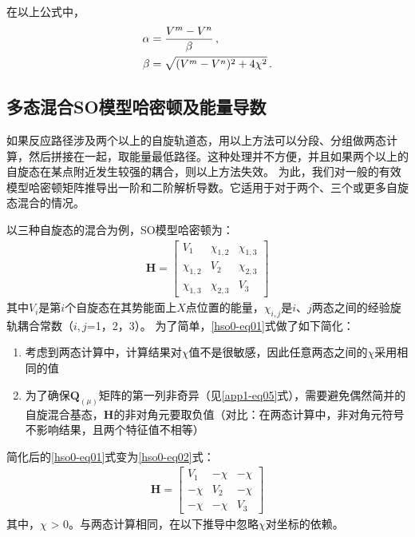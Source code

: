 \documentclass[UTF8]{ctexart}
\begin{document}
在以上公式中，
\begin{align}\label{para-eq01}
\alpha &= \frac{V^m - V^n}{\beta} \, \rm , \\ \label{para-eq02}
\beta &= \sqrt{(V^m - V^n)^2 + 4\chi^2} \, \rm .
\end{align}

\subsection{多态混合SO模型哈密顿及能量导数}

如果反应路径涉及两个以上的自旋轨道态，用以上方法可以分段、分组做两态计算，然后拼接在一起，取能量最低路径\cite{ref4}。这种处理并不方便，并且如果两个以上的自旋态在某点附近发生较强的耦合，则以上方法失效。
为此，我们对一般的有效模型哈密顿矩阵推导出一阶和二阶解析导数。它适用于对于两个、三个或更多自旋态混合的情况。

以三种自旋态的混合为例，SO模型哈密顿为：
\begin{align}\label{hso0-eq01}
\mathbf{H} = \left[\begin{array}{ccc}
    V_1 & \chi_{1,2} & \chi_{1,3} \\
    \chi_{1,2} & V_2 & \chi_{2,3} \\
    \chi_{1,3} & \chi_{2,3} & V_3
\end{array}\right]
\end{align}
其中$V_i$是第$i$个自旋态在其势能面上$X$点位置的能量，$\chi_{i,j}$是$i$、$j$两态之间的经验旋轨耦合常数（$i,j$=1，2，3）。
为了简单，\eqref{hso0-eq01}式做了如下简化：
\begin{enumerate}
\item 考虑到两态计算中，计算结果对$\chi$值不是很敏感，因此任意两态之间的$\chi$采用相同的值
\item 为了确保$\mathbf{Q}_{(\mu)}$矩阵的第一列非奇异（见\eqref{app1-eq05}式），需要避免偶然简并的自旋混合基态，$\mathbf{H}$的非对角元要取负值（对比：在两态计算中，非对角元符号不影响结果，且两个特征值不相等）
\end{enumerate}

简化后的\eqref{hso0-eq01}式变为\eqref{hso0-eq02}式：
\begin{align}\label{hso0-eq02}
\mathbf{H} = \left[\begin{array}{ccc}
    V_1 & -\chi & -\chi \\
    -\chi & V_2 & -\chi \\
    -\chi & -\chi & V_3
\end{array}\right]
\end{align}
其中，$\chi$ > 0。与两态计算相同，在以下推导中忽略$\chi$对坐标的依赖。
\end{document}
